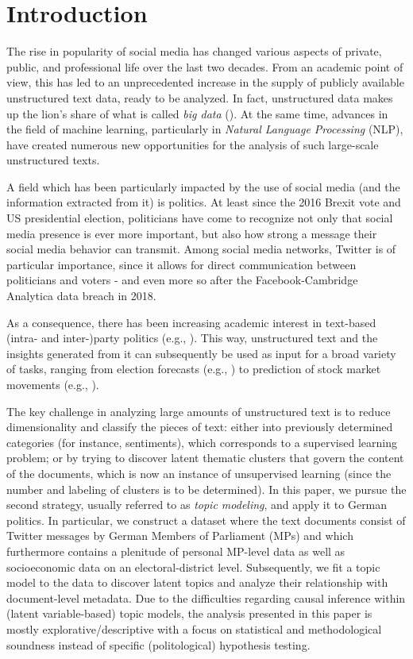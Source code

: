 \section{Introduction}

The rise in popularity of social media has changed various aspects of private, public, and professional life over the last two decades. From an academic point of view, this has led to an unprecedented increase in the supply of publicly available unstructured text data, ready to be analyzed. In fact, unstructured data makes up the lion's share of what is called \textit{big data} (\citealp{gandomi2015beyond}). At the same time, advances in the field of machine learning, particularly in \textit{Natural Language Processing} (NLP), have created numerous new opportunities for the analysis of such large-scale unstructured texts.

A field which has been particularly impacted by the use of social media (and the information extracted from it) is politics. At least since the 2016 Brexit vote and US presidential election, politicians have come to recognize not only that social media presence is ever more important, but also how strong a message their social media behavior can transmit. Among social media networks, Twitter is of particular importance, since it allows for direct communication between politicians and voters - and even more so after the Facebook-Cambridge Analytica data breach in 2018.

As a consequence, there has been increasing academic interest in text-based (intra- and inter-)party politics (e.g., \citealp{ceron2017intra, daniel2019static, grimmer2010bayesian, quinlan2018show}). This way, unstructured text and the insights generated from it can subsequently be used as input for a broad variety of tasks, ranging from election forecasts (e.g., \citealp{burnap2016140, jungherr2016twitter, tumasjan2010predicting}) to prediction of stock market movements (e.g., \citealp{nisar2018twitter}).

The key challenge in analyzing large amounts of unstructured text is to reduce dimensionality and classify the pieces of text: either into previously determined categories (for instance, sentiments), which corresponds to a supervised learning problem; or by trying to discover latent thematic clusters that govern the content of the documents, which is now an instance of unsupervised learning (since the number and labeling of clusters is to be determined). In this paper, we pursue the second strategy, usually referred to as \textit{topic modeling}, and apply it to German politics. In particular, we construct a dataset where the text documents consist of Twitter messages by German Members of Parliament (MPs) and which furthermore contains a plenitude of personal MP-level data as well as socioeconomic data on an electoral-district level. Subsequently, we fit a topic model to the data to discover latent topics and analyze their relationship with document-level metadata. Due to the difficulties regarding causal inference within (latent variable-based) topic models, the analysis presented in this paper is mostly explorative/descriptive with a focus on statistical and methodological soundness instead of specific (politological) hypothesis testing.

